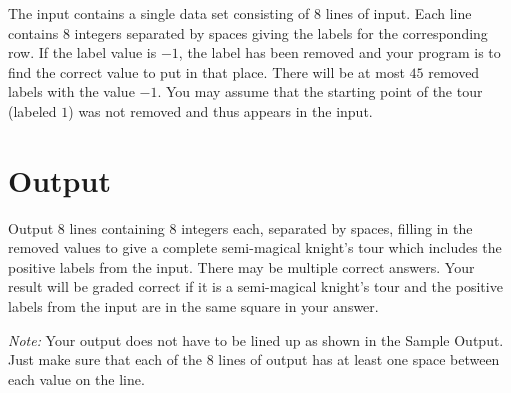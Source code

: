 The input contains a single data set consisting of $8$ lines of
input.  Each line contains $8$ integers
separated by spaces giving the labels for the corresponding row. If the
label value is $-1$, the label has been removed and your program is to
find the correct value to put in that place.
There will be at most $45$ removed labels with the value $-1$.
You may assume that the starting point of the tour (labeled $1$) was
not removed and thus appears in the input.

\section*{Output}

Output $8$ lines containing $8$ integers each, separated by spaces, filling in the removed
values to give a complete semi-magical knight's tour which includes the positive labels from the input.
There may be multiple correct answers.  Your result will be graded correct if it is a semi-magical
knight's tour and the positive labels from the input are in the same square in your answer.

\emph{Note:} Your output does not have to be lined up as shown in the Sample Output. Just make
sure that each of the $8$ lines of output has at least one space between each value on the line.

